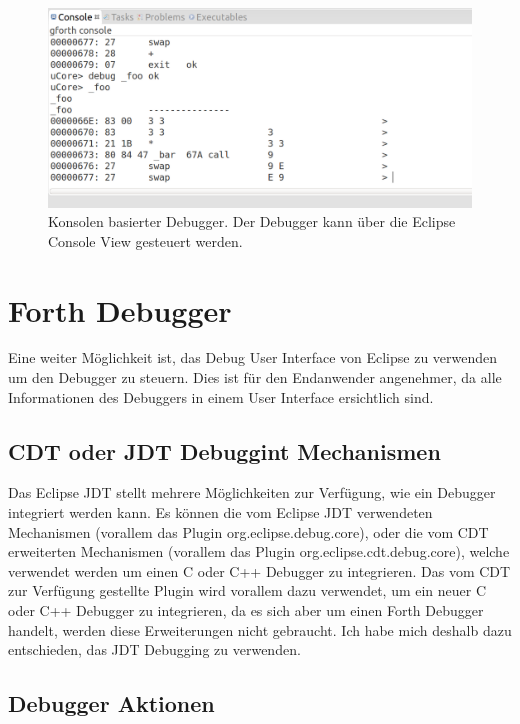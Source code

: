 \begin{figure}[H]
	\centering
		\includegraphics[scale=0.35]{debugger/consoledebugger.png}
		\caption{Konsolen basierter Debugger. Der Debugger kann über die Eclipse Console View gesteuert werden.}
		\label{fig:consoledebugger}
\end{figure}

\section{Forth Debugger}

Eine weiter Möglichkeit ist, das Debug User Interface von Eclipse zu verwenden um den Debugger zu steuern. Dies ist für den Endanwender angenehmer, da  alle Informationen des Debuggers in einem User Interface ersichtlich sind.

\subsection{CDT oder JDT Debuggint Mechanismen}

Das Eclipse JDT stellt  mehrere Möglichkeiten zur Verfügung, wie ein Debugger integriert werden kann. Es können die vom Eclipse JDT verwendeten Mechanismen (vorallem das Plugin org.eclipse.debug.core), oder die vom CDT erweiterten Mechanismen (vorallem das Plugin org.eclipse.cdt.debug.core), welche verwendet werden um einen C oder C++ Debugger zu integrieren. Das vom CDT zur Verfügung gestellte Plugin wird vorallem dazu verwendet, um ein neuer C oder C++ Debugger zu integrieren, da es sich aber um einen Forth Debugger handelt, werden diese Erweiterungen nicht gebraucht. Ich habe mich deshalb dazu entschieden, das JDT Debugging zu verwenden.

\subsection{Debugger Aktionen}


